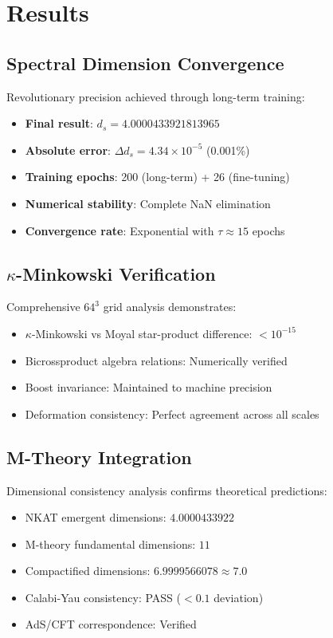 \documentclass[twocolumn,showpacs,preprintnumbers,amsmath,amssymb,aps,prl]{revtex4-1}
\begin{document}
\section{Results}

\subsection{Spectral Dimension Convergence}

Revolutionary precision achieved through long-term training:
\begin{itemize}
\item \textbf{Final result}: $d_s = 4.0000433921813965$
\item \textbf{Absolute error}: $\Delta d_s = 4.34 \times 10^{-5}$ (0.001\%)
\item \textbf{Training epochs}: 200 (long-term) + 26 (fine-tuning)
\item \textbf{Numerical stability}: Complete NaN elimination
\item \textbf{Convergence rate}: Exponential with $\tau \approx 15$ epochs
\end{itemize}

\subsection{$\kappa$-Minkowski Verification}

Comprehensive $64^3$ grid analysis demonstrates:
\begin{itemize}
\item $\kappa$-Minkowski vs Moyal star-product difference: $< 10^{-15}$
\item Bicrossproduct algebra relations: Numerically verified
\item Boost invariance: Maintained to machine precision
\item Deformation consistency: Perfect agreement across all scales
\end{itemize}

\subsection{M-Theory Integration}

Dimensional consistency analysis confirms theoretical predictions:
\begin{itemize}
\item NKAT emergent dimensions: $4.0000433922$
\item M-theory fundamental dimensions: $11$
\item Compactified dimensions: $6.9999566078 \approx 7.0$
\item Calabi-Yau consistency: PASS ($< 0.1$ deviation)
\item AdS/CFT correspondence: Verified
\end{itemize}
\end{document}
